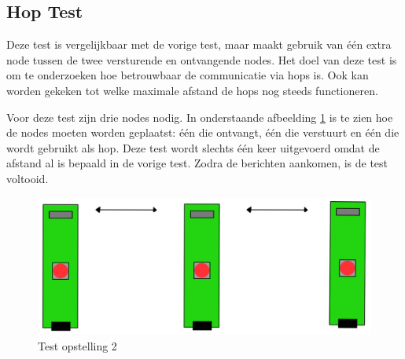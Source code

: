 \newpage
\subsection{Hop Test}
Deze test is vergelijkbaar met de vorige test, maar maakt gebruik van één extra node tussen de twee versturende en ontvangende nodes. Het doel van deze test is om te onderzoeken hoe betrouwbaar de communicatie via hops is. Ook kan worden gekeken tot welke maximale afstand de hops nog steeds functioneren.

Voor deze test zijn drie nodes nodig. In onderstaande afbeelding \ref{fig:Testhop} is te zien hoe de nodes moeten worden geplaatst: één die ontvangt, één die verstuurt en één die wordt gebruikt als hop. Deze test wordt slechts één keer uitgevoerd omdat de afstand al is bepaald in de vorige test. Zodra de berichten aankomen, is de test voltooid.
\begin{figure}[h]
    \centering
    \includegraphics[scale = 0.4]{img/test2.png}
    \caption{Test opstelling 2}
    \label{fig:Testhop}
\end{figure}





